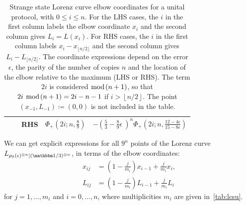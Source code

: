 \documentclass[pra,
aps,
twocolumn,
superscriptaddress,
groupedaddress,
nofootinbib,
reprint
]{revtex4-1}
\begin{document}
\begin{table}[h]
\begin{tabular}{c|c|c|r|r}
    & & RHS & $\Phi_+\left(2i;n,\frac{8}{9}\right)$ & $- \left( \frac{5}{3} - \frac{8}{9}\epsilon\ \right)^n\Phi_+\left(2i;n,\frac{12-4\epsilon}{15-8\epsilon}\right)$ \\ \hline
  \end{tabular}
  \caption{Strange state Lorenz curve elbow coordinates for a unital protocol, with $0 \leq i \leq n$. 
  For the LHS cases, the $i$ in the first column labels the elbow coordinate $x_i$ and the second column gives $L_i=L(x_i)$. For RHS cases, the $i$ in the first column labels $x_i - x_{\lfloor n/2 \rfloor}$ and the second column gives $L_i - L_{\lfloor n/2 \rfloor}$.
  The coordinate expressions depend on the error $\epsilon$, the parity of the number of copies $n$ and the location of the elbow relative to the maximum (LHS or RHS).
  The term $2i$ is considered $\hspace{-6pt}\mod{\hspace{-2pt}(n+1)}$, so that $2i\ \hspace{-6pt}\mod{\hspace{-2pt}(n+1)} = 2i - n - 1$ if $i > \left\lfloor n/2 \right\rfloor$.
  The point $(x_{-1}, L_{-1}) \coloneqq (0,0)$ is not included in the table.
  }
  \label{tab:lcsu_coord_elb_app}
\end{table}

We can get explicit expressions for all $9^{n}$ points of the Lorenz curve $\lc{\rho_{\rm{S}}(\epsilon)^{\otimes n}}{(\id/3)^{\otimes n}}$, in terms of the elbow coordinates:
\begin{align}
    x_{ij} &= \left( 1-\frac{j}{m_{i}} \right) x_{i-1} + \frac{j}{m_{i}} x_{i}, \label{eq:x}\\
    L_{ij} &= \left( 1-\frac{j}{m_{i}} \right) L_{i-1} + \frac{j}{m_{i}} L_{i} \label{eq:l}
\end{align}
for $j = 1,\dots,m_{i}$ and $i=0,\dots,n$, where multiplicities $m_i$ are given in~\cref{tab:lcsu}.
\end{document}
